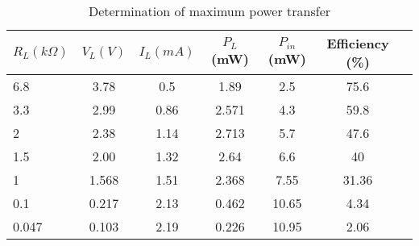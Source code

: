 \documentclass{article}
\begin{document}
        
  
  
      \begin{table}[!ht]
  \centering
  \caption{ Determination of maximum power transfer }
  \label{tab: maxpower }
  \begin{tabular}{   | l | c | c | c | c | c | r | }
  \hline

      $R_L(k \Omega)$ &     $V_L(V)$ &     $I_L(mA)$ &    $P_L$ (mW) &    $P_{in}$ (mW) &    Efficiency (\%)     \\ \hline
      6.8 &    3.78 &    0.5 &    1.89 &    2.5 &    75.6     \\ \hline
      3.3 &    2.99 &    0.86 &    2.571 &    4.3 &    59.8     \\ \hline
      2 &    2.38 &    1.14 &    2.713 &    5.7 &    47.6     \\ \hline
      1.5 &     2.00 &    1.32 &    2.64 &    6.6 &    40     \\ \hline
      1 &     1.568 &    1.51 &    2.368 &    7.55 &    31.36     \\ \hline
      0.1 &     0.217 &     2.13 &    0.462 &    10.65 &    4.34     \\ \hline
      0.047 &     0.103 &     2.19 &    0.226 &    10.95 &    2.06     \\ \hline
  
  \end{tabular}
  \end{table}
\end{document}
